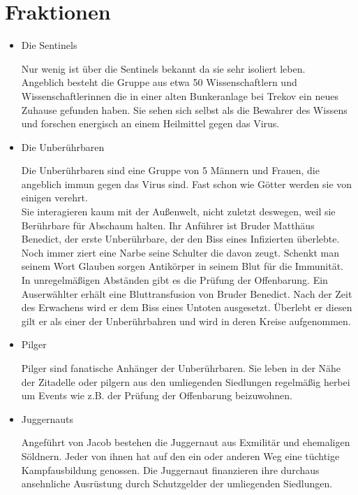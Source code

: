 \documentclass{include/protokollclass}
\newcommand{\gqm}[1]{\glqq#1\grqq}
\begin{document}
\section{Fraktionen}
\begin{itemize}
  \item Die Sentinels

Nur wenig ist über die Sentinels bekannt da sie sehr isoliert leben.\\Angeblich besteht die Gruppe aus etwa 50 Wissenschaftlern und Wissenschaftlerinnen die in einer alten Bunkeranlage bei Trekov ein neues Zuhause gefunden haben. Sie sehen sich selbst als die Bewahrer des Wissens und forschen energisch an einem Heilmittel gegen das Virus.

  \item Die Unberührbaren

Die Unberührbaren sind eine Gruppe von 5 Männern und Frauen, die angeblich immun gegen das Virus sind. Fast schon wie Götter werden sie von einigen verehrt.
\\Sie interagieren kaum mit der Außenwelt, nicht zuletzt deswegen, weil sie \gqm{Berührbare} für Abschaum halten. Ihr Anführer ist Bruder Matthäus Benedict, der erste Unberührbare, der den Biss eines Infizierten überlebte.
\\Noch immer ziert eine Narbe seine Schulter die davon zeugt. Schenkt man seinem Wort Glauben sorgen Antikörper in seinem Blut für die Immunität.
\\In unregelmäßigen Abständen gibt es die Prüfung der Offenbarung. Ein Auserwählter erhält eine Bluttransfusion von Bruder Benedict. Nach der Zeit des Erwachens wird er dem Biss eines Untoten ausgesetzt. Überlebt er diesen gilt er als einer der Unberührbahren und wird in deren Kreise aufgenommen.

  \item Pilger

Pilger sind fanatische Anhänger der Unberührbaren. Sie leben in der Nähe der Zitadelle oder pilgern aus den umliegenden Siedlungen regelmäßig herbei um Events wie z.B. der Prüfung der Offenbarung beizuwohnen.

  \item Juggernauts

Angeführt von \gqm{Jacob} bestehen die Juggernaut aus Exmilitär und ehemaligen Söldnern. Jeder von ihnen hat auf den ein oder anderen Weg eine tüchtige Kampfausbildung genossen. Die Juggernaut finanzieren ihre durchaus ansehnliche Ausrüstung durch Schutzgelder der umliegenden Siedlungen.


\end{itemize}
\end{document}
